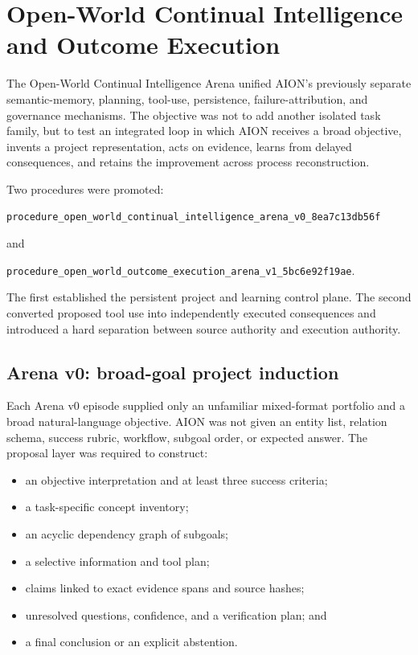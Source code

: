 
\section{Open-World Continual Intelligence and Outcome Execution}
\label{sec:open-world-arenas-v0-v1}

The Open-World Continual Intelligence Arena unified AION's previously separate
semantic-memory, planning, tool-use, persistence, failure-attribution, and
governance mechanisms.  The objective was not to add another isolated task
family, but to test an integrated loop in which AION receives a broad objective,
invents a project representation, acts on evidence, learns from delayed
consequences, and retains the improvement across process reconstruction.

Two procedures were promoted:
\begin{center}
{\footnotesize\texttt{procedure\_open\_world\_continual\_intelligence\_arena\_v0\_8ea7c13db56f}}
\end{center}
and
\begin{center}
{\footnotesize\texttt{procedure\_open\_world\_outcome\_execution\_arena\_v1\_5bc6e92f19ae}}.
\end{center}
The first established the persistent project and learning control plane.  The
second converted proposed tool use into independently executed consequences
and introduced a hard separation between source authority and execution
authority.


\subsection{Arena v0: broad-goal project induction}
\label{subsec:arena-v0-project-induction}

Each Arena v0 episode supplied only an unfamiliar mixed-format portfolio and a
broad natural-language objective.  AION was not given an entity list, relation
schema, success rubric, workflow, subgoal order, or expected answer.  The
proposal layer was required to construct:
\begin{itemize}
  \item an objective interpretation and at least three success criteria;
  \item a task-specific concept inventory;
  \item an acyclic dependency graph of subgoals;
  \item a selective information and tool plan;
  \item claims linked to exact evidence spans and source hashes;
  \item unresolved questions, confidence, and a verification plan; and
  \item a final conclusion or an explicit abstention.
\end{itemize}

